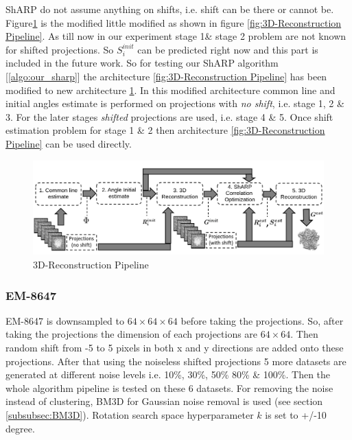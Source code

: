 \documentclass{report}
\begin{document}
ShARP do not assume anything on shifts, i.e. shift can be there or cannot be.  Figure\ref{fig:3D-Reconstruction Pipeline-Sharp} is the modified little modified as shown in figure \ref{fig:3D-Reconstruction Pipeline}. As till now in our experiment stage 1\& stage 2 problem are not known for shifted projections. So $S_i^{init}$ can be predicted right now and this part is included in the future work. So for testing our ShARP algorithm [\ref{algo:our_sharp}] the architecture \ref{fig:3D-Reconstruction Pipeline} has been modified to new architecture \ref{fig:3D-Reconstruction Pipeline-Sharp}. In this modified architecture common line and initial angles estimate is performed on projections with \textit{no shift}, i.e. stage 1, 2 \& 3. For the later stages \textit{shifted} projections are used, i.e. stage 4 \& 5. Once shift estimation problem for stage 1 \& 2 then architecture \ref{fig:3D-Reconstruction Pipeline} can be used directly.

\begin{figure}[H]
\includegraphics[width=1\textwidth]{3d-reconstrction-pipepline-Sharp.png}
\centering
\captionsetup{justification=centering}
\caption{3D-Reconstruction Pipeline }
\label{fig:3D-Reconstruction Pipeline-Sharp}
\end{figure}

\subsubsection{EM-8647}
EM-8647 is downsampled to $64\times64\times64$ before taking the projections. So, after taking the projections the dimension of each projections are $64\times64$. Then random shift from -5 to 5 pixels in both x and y directions are added onto these projections. After that using the noiseless shifted projections 5 more datasets are generated at different noise levels i.e. 10\%, 30\%, 50\% 80\% \& 100\%. Then the whole algorithm pipeline is tested on these 6 datasets. For removing the noise instead of clustering, BM3D for Gaussian noise removal is used (see section \ref{subsubsec:BM3D}). Rotation search space hyperparameter $k$ is set to +/-10 degree.
\end{document}
